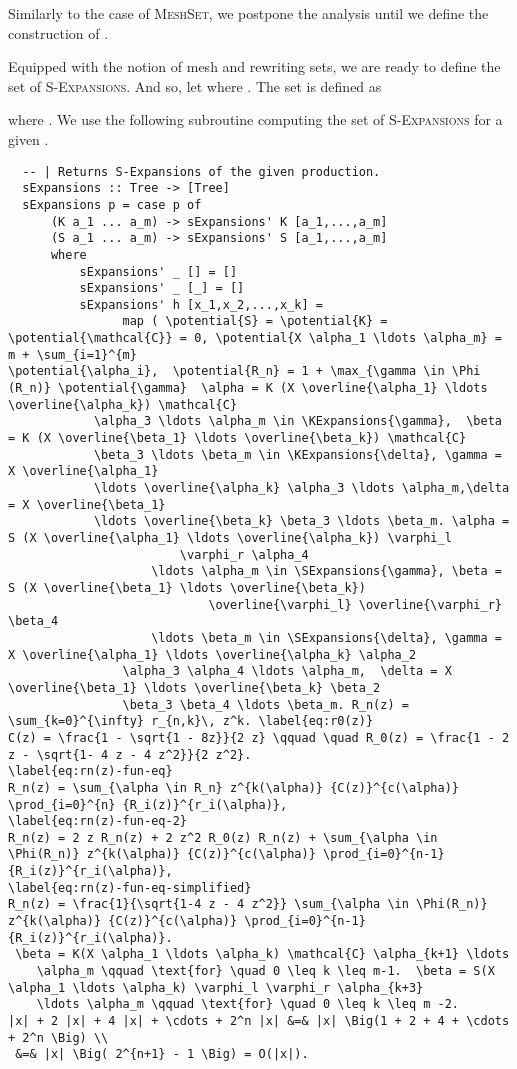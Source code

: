 \documentclass[11pt,a4paper]{amsart}
\theoremstyle{definition}
\newcommand{\KExpansions}[1]{\textsc{K-Expansions}(#1)}
\newcommand{\SExpansions}[1]{\textsc{S-Expansions}(#1)}
\newcommand{\potential}[1]{\pi(#1)}
\begin{document}
Similarly to the case of \textsc{MeshSet}, we postpone the analysis until we define the construction of .

Equipped with the notion of mesh and rewriting sets, we are ready to define the set of \textsc{S-Expansions}. And so, let  where . The set  is defined as

where . We use the following subroutine computing the set of \textsc{S-Expansions} for a given .

\begin{lstlisting}
  -- | Returns S-Expansions of the given production.
  sExpansions :: Tree -> [Tree]
  sExpansions p = case p of
      (K a_1 ... a_m) -> sExpansions' K [a_1,...,a_m]
      (S a_1 ... a_m) -> sExpansions' S [a_1,...,a_m]
      where
          sExpansions' _ [] = []
          sExpansions' _ [_] = []
          sExpansions' h [x_1,x_2,...,x_k] =
                map ( \potential{S} = \potential{K} = \potential{\mathcal{C}} = 0, \potential{X \alpha_1 \ldots \alpha_m} = m + \sum_{i=1}^{m}
\potential{\alpha_i},  \potential{R_n} = 1 + \max_{\gamma \in \Phi (R_n)} \potential{\gamma}  \alpha = K (X \overline{\alpha_1} \ldots \overline{\alpha_k}) \mathcal{C}
            \alpha_3 \ldots \alpha_m \in \KExpansions{\gamma},  \beta = K (X \overline{\beta_1} \ldots \overline{\beta_k}) \mathcal{C}
            \beta_3 \ldots \beta_m \in \KExpansions{\delta}, \gamma = X \overline{\alpha_1}
            \ldots \overline{\alpha_k} \alpha_3 \ldots \alpha_m,\delta = X \overline{\beta_1}
            \ldots \overline{\beta_k} \beta_3 \ldots \beta_m. \alpha = S (X \overline{\alpha_1} \ldots \overline{\alpha_k}) \varphi_l
                        \varphi_r \alpha_4
                    \ldots \alpha_m \in \SExpansions{\gamma}, \beta = S (X \overline{\beta_1} \ldots \overline{\beta_k})
                            \overline{\varphi_l} \overline{\varphi_r} \beta_4
                    \ldots \beta_m \in \SExpansions{\delta}, \gamma = X \overline{\alpha_1} \ldots \overline{\alpha_k} \alpha_2
                \alpha_3 \alpha_4 \ldots \alpha_m,  \delta = X \overline{\beta_1} \ldots \overline{\beta_k} \beta_2
                \beta_3 \beta_4 \ldots \beta_m. R_n(z) = \sum_{k=0}^{\infty} r_{n,k}\, z^k. \label{eq:r0(z)}
C(z) = \frac{1 - \sqrt{1 - 8z}}{2 z} \qquad \quad R_0(z) = \frac{1 - 2 z - \sqrt{1- 4 z - 4 z^2}}{2 z^2}.
\label{eq:rn(z)-fun-eq}
R_n(z) = \sum_{\alpha \in R_n} z^{k(\alpha)} {C(z)}^{c(\alpha)} \prod_{i=0}^{n} {R_i(z)}^{r_i(\alpha)},
\label{eq:rn(z)-fun-eq-2}
R_n(z) = 2 z R_n(z) + 2 z^2 R_0(z) R_n(z) + \sum_{\alpha \in \Phi(R_n)} z^{k(\alpha)} {C(z)}^{c(\alpha)} \prod_{i=0}^{n-1} {R_i(z)}^{r_i(\alpha)},
\label{eq:rn(z)-fun-eq-simplified}
R_n(z) = \frac{1}{\sqrt{1-4 z - 4 z^2}} \sum_{\alpha \in \Phi(R_n)} z^{k(\alpha)} {C(z)}^{c(\alpha)} \prod_{i=0}^{n-1} {R_i(z)}^{r_i(\alpha)}.
 \beta = K(X \alpha_1 \ldots \alpha_k) \mathcal{C} \alpha_{k+1} \ldots
    \alpha_m \qquad \text{for} \quad 0 \leq k \leq m-1.  \beta = S(X \alpha_1 \ldots \alpha_k) \varphi_l \varphi_r \alpha_{k+3}
    \ldots \alpha_m \qquad \text{for} \quad 0 \leq k \leq m -2. 
|x| + 2 |x| + 4 |x| + \cdots + 2^n |x| &=& |x| \Big(1 + 2 + 4 + \cdots + 2^n \Big) \\
 &=& |x| \Big( 2^{n+1} - 1 \Big) = O(|x|).


\end{lstlisting}
\end{document}
